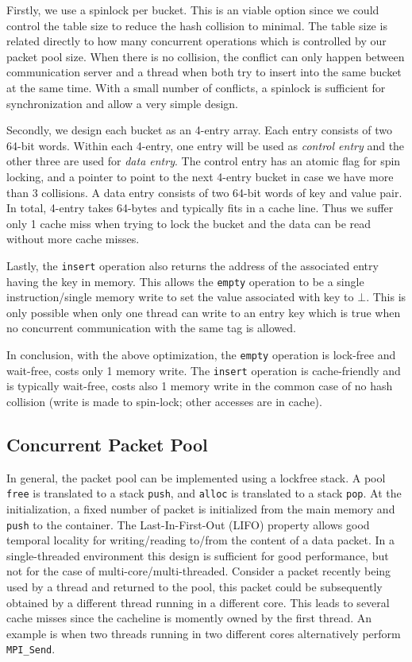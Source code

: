 Firstly, we use a spinlock per bucket. This is an viable option since we could
control the table size to reduce the hash collision to minimal. The table size is
related directly to how many concurrent operations which is controlled by 
our packet pool size. When there is no collision, the conflict can only happen
between communication server and a thread when both try to insert into the same
bucket at the same time. With a small number of conflicts, a spinlock is
sufficient for synchronization and allow a very simple design.

Secondly, we design each bucket as an 4-entry array. Each entry consists of two
64-bit words. Within each 4-entry, one entry will be used as \textit{control
entry} and the other three are used for \textit{data entry}. The control entry
has an atomic flag for spin locking, and a pointer to point to the next 4-entry
bucket in case we have more than 3 collisions. A data entry consists of two
64-bit words of key and value pair. In total, 4-entry takes 64-bytes and
typically fits in a cache line. Thus we suffer only 1 cache miss when trying to
lock the bucket and the data can be read without more cache misses.

Lastly, the \texttt{insert} operation also returns the address of the
associated entry having the key in memory. This allows the \texttt{empty}
operation to be a single instruction/single memory write to set the value
associated with key to $\bot$. This is only possible when only one thread can
write to an entry key which is true when no concurrent communication with the
same tag is allowed.

In conclusion, with the above optimization, the \texttt{empty} operation is
lock-free and wait-free, costs only 1 memory write. The \texttt{insert}
operation is cache-friendly and is typically wait-free, costs also 1 memory
write in the common case of no hash collision (write is made to spin-lock;
other accesses are in cache).

\subsection{Concurrent Packet Pool}
In general, the packet pool can be implemented using a lockfree stack. A pool
\texttt{free} is translated to a stack \texttt{push}, and \texttt{alloc} is
translated to a stack \texttt{pop}. At the initialization, a fixed number of
packet is initialized from the main memory and \texttt{push} to the container.
The Last-In-First-Out (LIFO) property allows good temporal locality for
writing/reading to/from the content of a data packet. In a single-threaded
environment this design is sufficient for good performance, but not for the
case of multi-core/multi-threaded. Consider a packet recently being used by a thread
and returned to the pool, this packet could be subsequently obtained by a different thread
running in a different core. This leads to several cache misses since the cacheline
is momently owned by the first thread. An example is when two threads running in 
two different cores alternatively perform \texttt{MPI_Send}.

